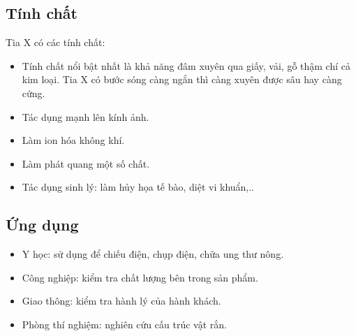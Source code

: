 \subsection{Tính chất}

Tia X có các tính chất:

\begin{itemize}
	\item Tính chất nổi bật nhất là khả năng đâm xuyên qua giấy, vải, gỗ thậm chí cả kim loại. Tia X có bước sóng càng ngắn thì càng xuyên được sâu hay càng cứng.
	\item Tác dụng mạnh lên kính ảnh.
	\item Làm ion hóa không khí. 
	\item Làm phát quang một số chất.
	\item Tác dụng sinh lý: làm hủy họa tế bào, diệt vi khuẩn,..
	
\end{itemize}

\subsection{Ứng dụng}

\begin{itemize}
	\item Y học: sử dụng để chiếu điện, chụp điện, chữa ung thư nông.
	\item Công nghiệp: kiểm tra chất lượng bên trong sản phẩm.
	\item Giao thông: kiểm tra hành lý của hành khách.
	\item Phòng thí nghiệm: nghiên cứu cấu trúc vật rắn.
\end{itemize}

